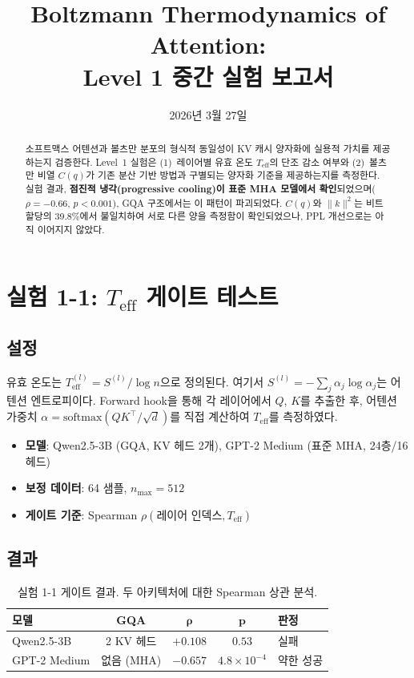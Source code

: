 \documentclass[11pt,a4paper]{article}
\title{Boltzmann Thermodynamics of Attention:\\Level 1 중간 실험 보고서}
\author{2026년 3월 27일}
\date{}
\begin{document}
\maketitle

\begin{abstract}
소프트맥스 어텐션과 볼츠만 분포의 형식적 동일성이 KV 캐시 양자화에 실용적 가치를 제공하는지 검증한다.
Level~1 실험은 (1)~레이어별 유효 온도 $T_\mathrm{eff}$의 단조 감소 여부와 (2)~볼츠만 비열 $C(q)$가 기존 분산 기반 방법과 구별되는 양자화 기준을 제공하는지를 측정한다.
실험 결과, \textbf{점진적 냉각(progressive cooling)이 표준 MHA 모델에서 확인}되었으며($\rho=-0.66$, $p<0.001$), GQA 구조에서는 이 패턴이 파괴되었다.
$C(q)$와 $\|k\|^2$는 비트 할당의 39.8\%에서 불일치하여 서로 다른 양을 측정함이 확인되었으나, PPL 개선으로는 아직 이어지지 않았다.
\end{abstract}

\section{실험 1-1: $T_\mathrm{eff}$ 게이트 테스트}

\subsection{설정}
유효 온도는 $T_\mathrm{eff}^{(l)} = S^{(l)} / \log n$으로 정의된다. 여기서 $S^{(l)} = -\sum_j \alpha_j \log \alpha_j$는 어텐션 엔트로피이다.
Forward hook을 통해 각 레이어에서 $Q$, $K$를 추출한 후, 어텐션 가중치 $\alpha = \mathrm{softmax}(QK^\top / \sqrt{d})$를 직접 계산하여 $T_\mathrm{eff}$를 측정하였다.

\begin{itemize}[nosep]
  \item \textbf{모델}: Qwen2.5-3B (GQA, KV 헤드 2개), GPT-2 Medium (표준 MHA, 24층/16헤드)
  \item \textbf{보정 데이터}: 64 샘플, $n_\mathrm{max} = 512$
  \item \textbf{게이트 기준}: Spearman $\rho(\text{레이어 인덱스}, T_\mathrm{eff})$
\end{itemize}

\subsection{결과}

\begin{table}[H]
\centering
\caption{실험 1-1 게이트 결과. 두 아키텍처에 대한 Spearman 상관 분석.}
\label{tab:gate}
\begin{tabular}{lcccl}
\toprule
\textbf{모델} & \textbf{GQA} & $\boldsymbol{\rho}$ & $\boldsymbol{p}$ & \textbf{판정} \\
\midrule
Qwen2.5-3B & 2 KV 헤드 & $+0.108$ & $0.53$ & \textcolor{failure}{실패} \\
GPT-2 Medium & 없음 (MHA) & $-0.657$ & $4.8\times10^{-4}$ & \textcolor{partial}{약한 성공} \\
\bottomrule
\end{tabular}
\end{table}
\end{document}
